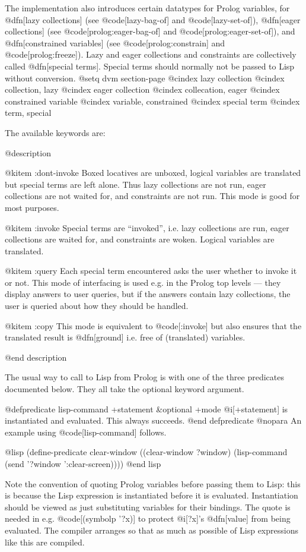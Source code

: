 {The implementation also introduces certain datatypes for Prolog variables, for
@dfn[lazy collections] (see @code[lazy-bag-of] and @code[lazy-set-of]), 
@dfn[eager collections] 
(see @code[prolog:eager-bag-of] and @code[prolog:eager-set-of]), 
and @dfn[constrained variables] (see @code[prolog:constrain] and @code[prolog:freeze]).
Lazy and eager collections and constraints are collectively called
@dfn[special terms].  Special terms should normally not be passed to Lisp
without conversion.
@setq dvm section-page
@cindex lazy collection
@cindex collection, lazy
@cindex eager collection
@cindex collecation, eager
@cindex constrained variable
@cindex variable, constrained
@cindex special term
@cindex term, special

The available keywords are:

@description

@kitem :dont-invoke
Boxed locatives are unboxed,
logical variables are translated but special terms are left alone.
Thus lazy collections are not run, eager collections are not waited for,
and constraints are not run.  This mode is good for most purposes.

@kitem :invoke
Special terms are ``invoked'', i.e.
lazy collections are run, eager collections are waited for,
and constraints are woken.  Logical variables are translated.

@kitem :query
Each special term encountered asks the user whether to invoke it or
not.  This mode of interfacing is used e.g. in the Prolog top levels
--- they display answers to user queries, but if the answers contain
lazy collections, the user is queried about how they should be
handled.

@kitem :copy
This mode is equivalent to @code[:invoke] but also ensures that the
translated result is @dfn[ground] i.e. free of (translated) variables.

@end description

The usual way to call to Lisp from Prolog is with one of the three
predicates documented below.  They all take the optional keyword argument.

@defpredicate lisp-command +statement &optional +mode
@i[+statement] is instantiated and evaluated.  This always succeeds.
@end defpredicate
@nopara
An example using @code[lisp-command] follows.

@lisp
(define-predicate clear-window
 ((clear-window ?window) 
  (lisp-command (send '?window ':clear-screen))))
@end lisp

Note the convention of quoting Prolog variables before passing them to Lisp:
this is because the Lisp expression is instantiated before it is evaluated.
Instantiation should be viewed as just substituting variables for their 
bindings. The quote is needed in e.g. @code[(symbolp '?x)] to protect 
@i[?x]'s @dfn[value] from being evaluated.
The compiler arranges so that as much as possible of Lisp expressions like
this are compiled.

}
